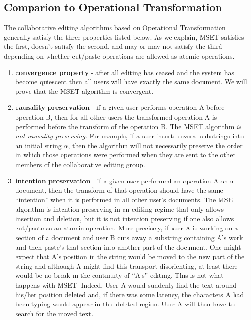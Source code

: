 \documentclass{amsart}
\begin{document}
\subsection{Comparion to Operational Transformation}
The collaborative editing algorithms based on Operational Transformation generally satisfy the three properties listed below.
As we explain, MSET satisfies the first, doesn't satisfy the second, and may or may not satisfy the third depending on whether
cut/paste operations are allowed as atomic operations.
\begin{enumerate}
\item {\bf convergence property} - after all editing has ceased and the system has become quiescent then all users will
have exactly the same document.  We will prove that the MSET algorithm is convergent. 
\item {\bf causality preservation} - if a given user performs operation A before operation B, then for all other users
the transformed operation A is performed before the transform of the operation B.  The MSET algorithm 
{\it is not causality preserving}. 
For example, if a user inserts several
substrings into an initial string $\alpha$, then the algorithm will not necessarily preserve the order in which those operations
were performed when they are sent to the other members of the collaborative editing group.
\item {\bf intention preservation} - if a given user performed an operation A on a document, then the transform of that operation
should have the same ``intention'' when it is performed in all other user's documents. 
The MSET algorithm is intention preserving in an editing regime that only allows insertion and
deletion, but it is not intention preserving if one also allows cut/paste as an atomic operation. More precisely, if user A is working
on a section of a document and user B cuts away a substring containing A's work and then paste's that section into another part
of the document. One might expect that A's position in the string would be moved to the new part of the string and although 
A might find this transport disorienting, at least there would be no break in the continuity of ``A's'' editing.  
This is not what happens with MSET.
Indeed, User A would suddenly find the text around his/her position deleted and, if there was some latency, 
the characters A had been typing would appear in this deleted region. User A will then have to search for the moved text.
\end{enumerate}
\end{document}
